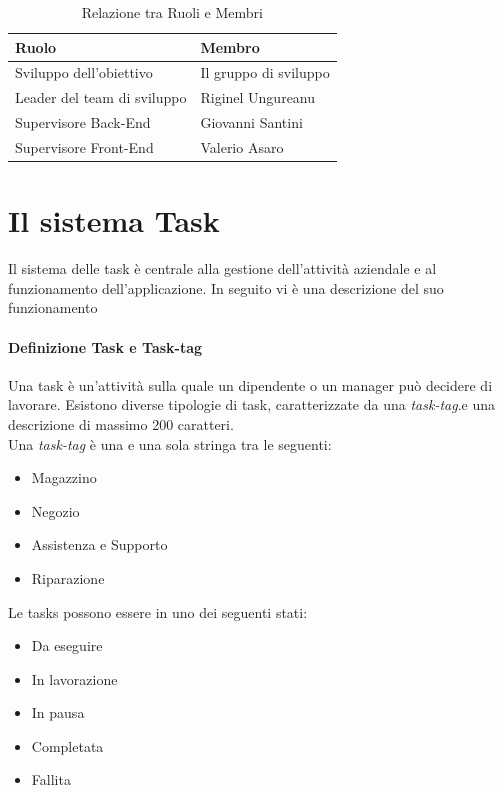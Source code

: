 \documentclass{report}
\begin{document}
\begin{table}[!ht]
	\begin{center} %
		\centering
		\begin{tabular}{ |p{5cm}|p{5cm}|  }
			\hline
			\centering Ruolo & \qquad\qquad\quad Membro \\ %
			\hline
			Sviluppo dell'obiettivo & Il gruppo di sviluppo \\
			\hline
			Leader del team di sviluppo & Riginel Ungureanu \\
			\hline
			Supervisore Back-End &
			Giovanni Santini \\
			\hline
			Supervisore Front-End & Valerio Asaro\\
			\hline
		\end{tabular}
		\caption{Relazione tra Ruoli e Membri}
	\end{center}
\end{table}

\chapter{Il sistema Task}
\label{chap:tasks}

Il sistema delle task è centrale alla gestione dell'attività aziendale e al funzionamento dell'applicazione. In seguito vi è una descrizione del suo funzionamento

\subsubsection*{Definizione Task e Task-tag}

Una task è un'attività sulla quale un dipendente o un manager può decidere di lavorare. Esistono diverse tipologie di task, caratterizzate da una \textit{task-tag}.e una descrizione di massimo 200 caratteri.\\
Una \textit{task-tag} è una e una sola stringa tra le seguenti:
\begin{itemize}
	\item Magazzino
	\item Negozio
	\item Assistenza e Supporto
	\item Riparazione
\end{itemize}
Le tasks possono essere in uno dei seguenti stati: 
\begin{itemize}
	\item Da eseguire
	\item In lavorazione
	\item In pausa
	\item Completata
	\item Fallita
\end{itemize}
\end{document}
